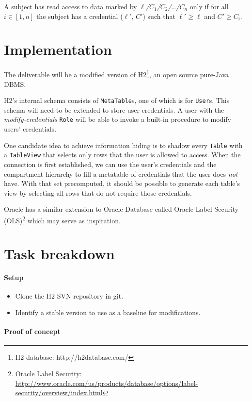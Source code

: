 \documentclass{article}
\begin{document}
A subject has read access to data marked by {\it $\ell$/$C_1$/$C_2$/\ldots/$C_n$} only if for all $i \in [1, n]$ the subject has a credential ($\ell'$, $C'$) such that $\ell' \ge \ell$ and $C' \ge C_i$.

\section{Implementation}

The deliverable will be a modified version of H2\footnote{H2 database: http://h2database.com/}, an open source pure-Java DBMS.

H2's internal schema consists of {\tt MetaTable}s, one of which is for {\tt User}s. This schema will need to be extended to store user credentials. A user with the {\it modify-credentials} {\tt Role} will be able to invoke a built-in procedure to modify users' credentials.

One candidate idea to achieve information hiding is to shadow every {\tt Table} with a {\tt TableView} that selects only rows that the user is allowed to access. When the connection is first established, we can use the user's credentials and the compartment hierarchy to fill a metatable of credentials that the user does {\it not} have. With that set precomputed, it should be possible to generate each table's view by selecting all rows that do not require those credentials.

Oracle has a similar extension to Oracle Database called Oracle Label Security (OLS)\footnote{Oracle Label Security: \url{http://www.oracle.com/us/products/database/options/label-security/overview/index.html}} which may serve as inspiration.

\pagebreak

\section{Task breakdown}

\paragraph{Setup}

\begin{itemize}
\item Clone the H2 SVN repository in git.
\item Identify a stable version to use as a baseline for modifications.
\end{itemize}

\paragraph{Proof of concept}
\end{document}
